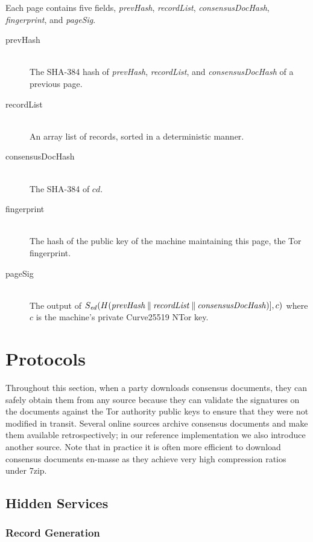 Each page contains five fields, \emph{prevHash}, \emph{recordList}, \emph{consensusDocHash}, \emph{fingerprint}, and \emph{pageSig}.

\begin{description}
	\item[prevHash] \hfill \\
		The SHA-384 hash of \emph{prevHash}, \emph{recordList}, and \emph{consensusDocHash} of a previous page.
	\item[recordList] \hfill \\
		An array list of records, sorted in a deterministic manner.
	\item[consensusDocHash] \hfill \\
		The SHA-384 of $ cd $.
	\item[fingerprint] \hfill \\
		The hash of the public key of the machine maintaining this page, the Tor fingerprint.
	\item[pageSig] \hfill \\
		The output of $ S_{\mathit{ed}}(H(\mathit{prevHash} \mathbin{\|} \mathit{recordList} \mathbin{\|} \mathit{consensusDocHash})], c) $ where $ c $ is the machine's private Curve25519 NTor key.
\end{description}

\section{Protocols}
\label{sec:Protocols}

Throughout this section, when a party downloads consensus documents, they can safely obtain them from any source because they can validate the signatures on the documents against the Tor authority public keys to ensure that they were not modified in transit. Several online sources archive consensus documents and make them available retrospectively; in our reference implementation we also introduce another source. Note that in practice it is often more efficient to download consensus documents en-masse as they achieve very high compression ratios under 7zip.


\subsection{Hidden Services}
\label{sec:ProtoHiddenServices}

\subsubsection{Record Generation}


